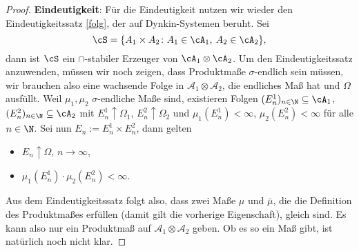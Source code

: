 \begin{proof}
\textbf{Eindeutigkeit}: F\"ur die Eindeutigkeit nutzen wir wieder den Eindeutigkeitssatz \ref{folg}, der auf Dynkin-Systemen beruht. Sei
$$ \cS = \{ A_1 \times A_2\colon A_1 \in \cA_1, \: A_2 \in \cA_2 \},$$ dann ist $\cS$ ein $\cap$-stabiler Erzeuger von $ \cA_1 \otimes \cA_2 $. Um den Eindeutigkeitssatz anzuwenden, m\"ussen wir noch zeigen, dass Produktma\ss e $\sigma$-endlich sein m\"ussen, wir brauchen also eine wachsende Folge in $\mathcal A_1\otimes \mathcal A_2$, die endliches Ma\ss{} hat und $\Omega$ ausf\"ullt. Weil $\mu_1, \mu_2$ $\sigma$-endliche Ma\ss e sind, existieren Folgen $(E_n^1)_{n \in \N} \subseteq \cA_1$, $(E_n^2)_{n \in \N} \subseteq \cA_2$ mit $E_n^1 \uparrow \Omega_1$, $E_n^2 \uparrow \Omega_2$ und $\mu_1(E_n^1) < \infty$, $\mu_2(E_n^2) < \infty$ f\"ur alle $n \in \N$. Sei nun $E_n := E_n^1 \times E_n^2$, dann gelten
	\begin{itemize}
		\item $E_n \uparrow \Omega$, $n\to\infty$,
		\item $\mu_1(E_n^1) \cdot \mu_2(E_n^2) < \infty$.
	\end{itemize} 
	Aus dem Eindeutigkeitssatz folgt also, dass zwei Ma\ss e $\mu$ und $\bar\mu$, die die Definition des Produktma\ss es erf\"ullen (damit gilt die vorherige Eigenschaft), gleich sind. Es kann also nur ein Produktma\ss{} auf $\mathcal A_1\otimes \mathcal A_2$ geben. Ob es so ein Ma\ss{} gibt, ist nat\"urlich noch nicht klar. \smallskip
	

\end{proof}
